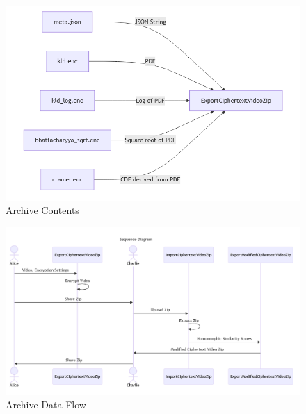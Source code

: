 \documentclass [11pt, proquest] {uwthesis}[2020/02/24]
\begin{document}
\begin{figure}
  \centering
  \includegraphics[width=\textwidth,height=\textheight,keepaspectratio]{Appendix/Figures/ciphertextArchive.png}
  \caption{Archive Contents}
  \label{fig:appendix_archiveContentDataFlow}
\end{figure}

\begin{figure}
  \centering
  \includegraphics[width=\textwidth,height=\textheight,keepaspectratio]{Appendix/Figures/shareArchiveSequence.png}
  \caption{Archive Data Flow}
  \label{fig:appendix_archiveDataFlow}
\end{figure}
\end{document}
